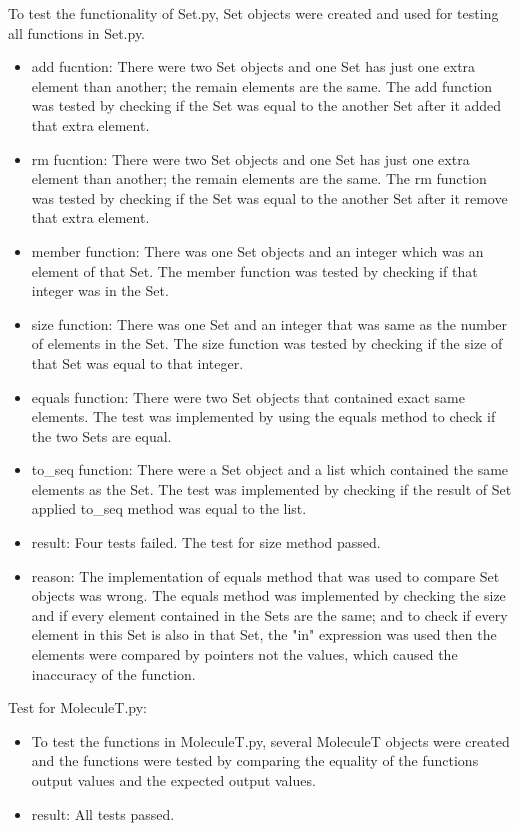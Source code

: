 \documentclass[12pt]{article}
\begin{document}
To test the functionality of Set.py, Set objects were created and used for testing all functions in Set.py.
\begin{itemize}
	\item add fucntion: There were two Set objects and one Set has just one extra element than another; the remain elements are the same. The add function was tested by checking if the Set was equal to the another Set after it added that extra element.
	\item rm fucntion: There were two Set objects and one Set has just one extra element than another; the remain elements are the same. The rm function was tested by checking if the Set was equal to the another Set after it remove that extra element.
	\item member function: There was one Set objects and an integer which was an element of that Set. The member function was tested by checking if that integer was in the Set.
	\item size function: There was one Set and an integer that was same as the number of elements in the Set. The size function was tested by checking if the size of that Set was equal to that integer.
	\item equals function: There were two Set objects that contained exact same elements. The test was implemented by using the equals method to check if the two Sets are equal.
	\item to\_seq function: There were a Set object and a list which contained the same elements as the Set. The test was implemented by checking if the result of Set applied to\_seq method was equal to the list.
	\item result: Four tests failed. The test for size method passed.
	\item reason: The implementation of equals method that was used to compare Set objects was wrong. The equals method was implemented by checking the size and if every element contained in the Sets are the same; and to check if every element in this Set is also in that Set, the "in" expression was used then the elements were compared by pointers not the values, which caused the inaccuracy of the function.
\end{itemize}

\smallskip

Test for MoleculeT.py:
\begin{itemize}
	\item To test the functions in MoleculeT.py, several MoleculeT objects were created and the functions were tested by comparing the equality of the functions output values and the expected output values.
	\item result: All tests passed.
\end{itemize}
\end{document}
